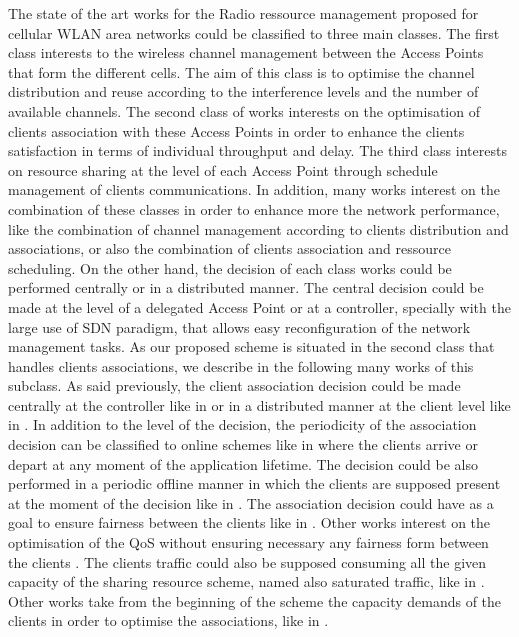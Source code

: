 \documentclass[journal,transmag]{IEEEtran}
\begin{document}
The state of the art works for the Radio ressource management proposed for cellular WLAN area networks could be classified to three main classes. The first class interests to the wireless channel management between the Access Points that form the different cells. The aim of this class is to optimise the channel distribution and reuse according to the interference levels and the number of available channels. The second class of works interests on the optimisation of clients association with these Access Points in order to enhance the clients satisfaction in terms of individual throughput and delay. The third class interests on resource sharing at the level of each Access Point through schedule management of clients communications. In addition, many works interest on the combination of these classes in order to enhance more the network performance, like the combination of channel management according to clients distribution and associations, or also the combination of clients association and ressource scheduling. On the other hand, the decision of each class works could be performed centrally or in a distributed manner. The central decision could be made at the level of a delegated Access Point or at a controller, specially with the large use of SDN paradigm, that allows easy reconfiguration of the network management tasks. As our proposed scheme is situated in the second class that handles clients associations, we describe in the following many works of this subclass.        
As said previously, the client association decision could be made centrally at the controller like in \cite{14AP_association_multirate_WLAN,16throughput_optimisation_association_bandwidth,16AP_association_optimisation_fairness,17QOS_AP_selection} or in a distributed manner at the client level like in \cite{17decentralised_AP_selection}. In addition to the level of the decision, the periodicity of the association decision can be classified to online schemes like in \cite{17QOS_AP_selection} where the clients arrive or depart at any moment of the application lifetime. The decision could be also performed in a periodic offline manner in which the clients are supposed present at the moment of the decision like in \cite{14AP_association_multirate_WLAN,16throughput_optimisation_association_bandwidth,16AP_association_optimisation_fairness}. 
The association decision could have as a goal to ensure fairness between the clients like in \cite{14AP_association_multirate_WLAN,16throughput_optimisation_association_bandwidth,16AP_association_optimisation_fairness}. Other works interest on the optimisation of the QoS without ensuring necessary any fairness form between the clients \cite{17QOS_AP_selection}. The clients traffic could also be supposed consuming all the given capacity of the sharing resource scheme, named also saturated traffic, like in \cite{14AP_association_multirate_WLAN,16AP_association_optimisation_fairness}. Other works take from the beginning of the scheme the capacity demands of the clients in order to optimise the associations, like in \cite{16throughput_optimisation_association_bandwidth,17QOS_AP_selection}.    
\end{document}

